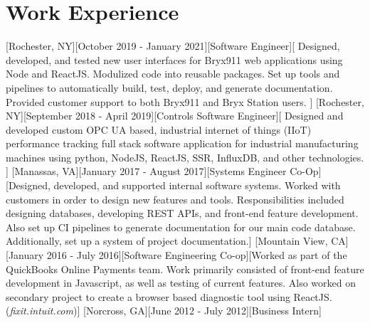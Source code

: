 \documentclass{resume}
\begin{document}
		\section{Work Experience}
		[Rochester, NY][October 2019 - January 2021][Software Engineer][%
		Designed, developed, and tested new user interfaces for Bryx911 web applications using Node and ReactJS. %
		Modulized code into reusable packages. %
		Set up tools and pipelines to automatically build, test, deploy, and generate documentation. %
		Provided customer support to both Bryx911 and Bryx Station users.%
		]%
		[Rochester, NY][September 2018 - April 2019][Controls Software Engineer][%
		Designed and developed custom OPC UA based, industrial internet of things (IIoT) performance tracking full stack software application for industrial manufacturing machines using python, NodeJS, ReactJS, SSR, InfluxDB, and other technologies.%
		]%
		[Manassas, VA][January 2017 - August 2017][Systems Engineer Co-Op][Designed, developed, and supported internal software systems. Worked with customers in order to design new features and tools. Responsibilities included designing databases, developing REST APIs, and front-end feature development. Also set up CI pipelines to generate documentation for our main code database. Additionally, set up a system of project documentation.]%
		[Mountain View, CA][January 2016 - July 2016][Software Engineering Co-op][Worked as part of the QuickBooks Online Payments team. Work primarily consisted of front-end feature development in Javascript, as well as testing of current features. Also worked on secondary project to create a browser based diagnostic tool using ReactJS. ({\it fixit.intuit.com})]%
		[Norcross, GA][June 2012 - July 2012][Business Intern]%
\end{document}
